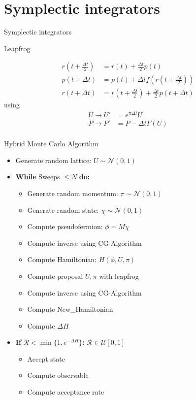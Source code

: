 \documentclass[10pt]{beamer}
\begin{document}
\section{Symplectic integrators}
\begin{frame}{Symplectic integrators}
    \begin{center} Leapfrog \end{center}
    \begin{align}
        r(t+\frac{\Delta t}{2}) &= r(t) + \frac{\Delta t}{2} p(t) \\
        p(t+\Delta t) &= p(t) +\Delta t f\left(r(t+\frac{\Delta t}{2})\right) \\
        r(t+\Delta t) &= r(t+\frac{\Delta t}{2}) + \frac{\Delta t}{2}p(t+\Delta t)
    \end{align}
    using
    \begin{align}
        U \to U' &= e^{\pi \Delta t} U\\
        P \to P' &= P  - \Delta t F(U)\\
    \end{align}
    
\end{frame}


\begin{frame}{Hybrid Monte Carlo Algorithm}
    \begin{itemize}
       \item Generate random lattice: $U \sim \mathcal{N}(0,1)  $
       \item \textbf{While} Sweeps $\leq  N $ \textbf{do:}
        \begin{itemize}
            \item Generate random momentum: $\pi \sim \mathcal{N}(0,1) $
            \item Generate random state: $\chi \sim \mathcal{N}(0,1) $
            \item Compute pseudofermion: $\phi = M \chi $
            \item Compute inverse using CG-Algorithm
            \item Compute Hamiltonian: $H(\phi,U,\pi)$
            \item Compute proposal $U,\pi$ with leapfrog
            \item Compute inverse using CG-Algorithm
            \item Compute New\_Hamiltonian
            \item Compute $\Delta H$
       \end{itemize}
       \item \textbf{If} $\mathcal{R} < \min\{1,e^{- \Delta H}\}$\textbf{:}  \hspace{3cm}       $\mathcal{R} \in \mathcal{U}[0,1]$
        \begin{itemize}
            \item Accept state 
            \item Compute observable
            \item Compute acceptance rate
        \end{itemize}
    \end{itemize}
\end{frame}
        
\end{document}
